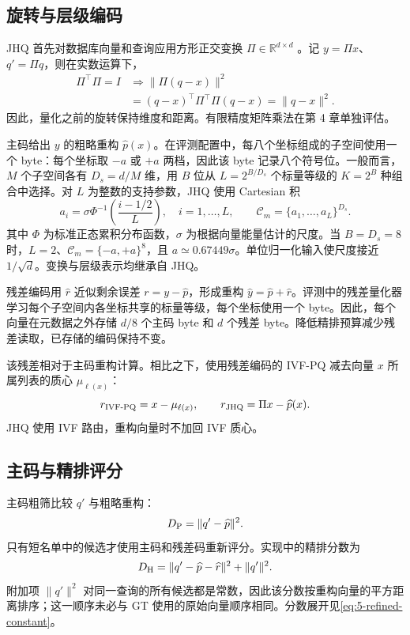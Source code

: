 \subsection{旋转与层级编码}

JHQ 首先对数据库向量和查询应用方形正交变换 $\Pi\in\mathbb R^{d\times d}$ \cite{jhq}。记 $y=\Pi x$、$q'=\Pi q$，则在实数运算下，
\begin{equation}
 \begin{aligned}
 \Pi^\top\Pi=I
 &\Longrightarrow
 \|\Pi(q-x)\|^2\\
 &=(q-x)^\top\Pi^\top\Pi(q-x)=\|q-x\|^2.
 \end{aligned}
 \label{eq:2-isometry}
\end{equation}
因此，量化之前的旋转保持维度和距离。有限精度矩阵乘法在第 4 章单独评估。

主码给出 $y$ 的粗略重构 $\widehat p(x)$。在评测配置中，每八个坐标组成的子空间使用一个 byte：每个坐标取 $-a$ 或 $+a$ 两档，因此该 byte 记录八个符号位。一般而言，$M$ 个子空间各有 $D_s=d/M$ 维，用 $B$ 位从 $L=2^{B/D_s}$ 个标量等级的 $K=2^B$ 种组合中选择。对 $L$ 为整数的支持参数，JHQ 使用 Cartesian 积
\begin{equation}
 a_i=\sigma\Phi^{-1}\!\left(\frac{i-1/2}{L}\right),\quad
 i=1,\ldots,L,\qquad
 \mathcal C_m=\{a_1,\ldots,a_L\}^{D_s}.
 \label{eq:2-cartesian}
\end{equation}
其中 $\Phi$ 为标准正态累积分布函数，$\sigma$ 为根据向量能量估计的尺度。当 $B=D_s=8$ 时，$L=2$、$\mathcal C_m=\{-a,+a\}^8$，且 $a\simeq0.67449\sigma$。单位归一化输入使尺度接近 $1/\sqrt d$。变换与层级表示均继承自 JHQ。

残差编码用 $\widehat r$ 近似剩余误差 $r=y-\widehat p$，形成重构 $\widehat y=\widehat p+\widehat r$。评测中的残差量化器学习每个子空间内各坐标共享的标量等级，每个坐标使用一个 byte。因此，每个向量在元数据之外存储 $d/8$ 个主码 byte 和 $d$ 个残差 byte。降低精排预算减少残差读取，已存储的编码保持不变。

该残差相对于主码重构计算。相比之下，使用残差编码的 IVF-PQ 减去向量 $x$ 所属列表的质心 $\mu_{\ell(x)}$：
\[
 r_{\rm IVF\text{-}PQ}=x-\mu_{\ell(x)},\qquad
 r_{\rm JHQ}=\Pi x-\widehat p(x).
\]
JHQ 使用 IVF 路由，重构向量时不加回 IVF 质心。

\subsection{主码与精排评分}

主码粗筛比较 $q'$ 与粗略重构：
\[
 D_{\mathrm{P}}=\|q'-\widehat p\|^2.
\]
只有短名单中的候选才使用主码和残差码重新评分。实现中的精排分数为
\begin{equation}
 D_{\mathrm{H}}=\|q'-\widehat p-\widehat r\|^2+\|q'\|^2.
 \label{eq:2-refined}
\end{equation}
附加项 $\|q'\|^2$ 对同一查询的所有候选都是常数，因此该分数按重构向量的平方距离排序；这一顺序未必与 GT 使用的原始向量顺序相同。分数展开见\cref{eq:5-refined-constant}。


